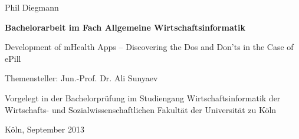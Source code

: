 \vspace*{1mm}

\thispagestyle{empty}
Phil Diegmann

\vspace*{23mm}

\begin{center}
\textbf{
    Bachelorarbeit
\linebreak
    im Fach Allgemeine Wirtschaftsinformatik}
\end{center}

\vspace*{20mm}

\begin{center}
\LARGE 
    Development of mHealth Apps – Discovering the Dos and Don'ts in the Case of ePill
\end{center}

\vspace*{8mm}

\begin{center}
    Themensteller: Jun.-Prof. Dr. Ali Sunyaev
\end{center}

\vspace*{12mm}

\begin{center}
    Vorgelegt in der Bachelorprüfung
\linebreak
    im Studiengang Wirtschaftsinformatik
\linebreak
    der Wirtschafts- und Sozialwissenschaftlichen Fakultät
\linebreak
    der Universität zu Köln
\end{center}

\vspace*{30mm}

\begin{center}
Köln, September 2013
\end{center}



